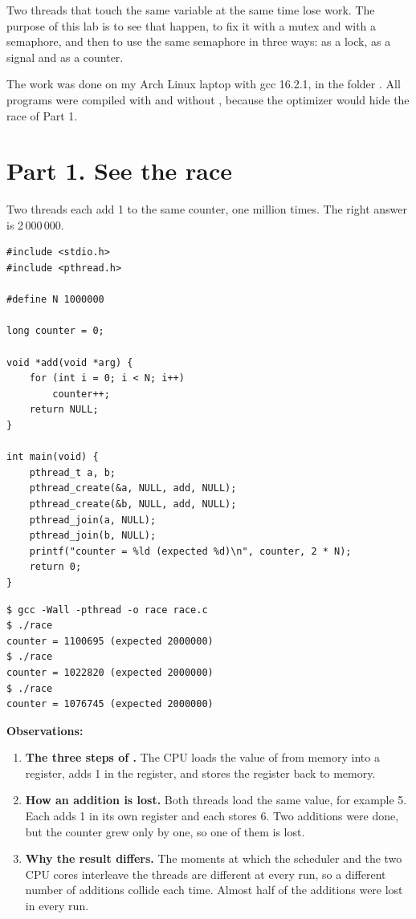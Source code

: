 \documentclass[11pt,a4paper]{article}
\begin{document}
\utmtitlepage
\tableofcontents
\newpage


Two threads that touch the same variable at the same time lose work. The purpose of this lab is
to see that happen, to fix it with a mutex and with a semaphore, and then to use the same
semaphore in three ways: as a lock, as a signal and as a counter.

The work was done on my Arch Linux laptop with gcc 16.2.1, in the folder
. All programs were compiled with  and without
, because the optimizer would hide the race of Part 1.

\section{Part 1. See the race}

Two threads each add 1 to the same counter, one million times. The right answer is 2\,000\,000.

\begin{lstlisting}[style=ccode,caption={race.c}]
#include <stdio.h>
#include <pthread.h>

#define N 1000000

long counter = 0;

void *add(void *arg) {
    for (int i = 0; i < N; i++)
        counter++;
    return NULL;
}

int main(void) {
    pthread_t a, b;
    pthread_create(&a, NULL, add, NULL);
    pthread_create(&b, NULL, add, NULL);
    pthread_join(a, NULL);
    pthread_join(b, NULL);
    printf("counter = %ld (expected %d)\n", counter, 2 * N);
    return 0;
}
\end{lstlisting}

\begin{lstlisting}[caption={Three runs of race}]
$ gcc -Wall -pthread -o race race.c
$ ./race
counter = 1100695 (expected 2000000)
$ ./race
counter = 1022820 (expected 2000000)
$ ./race
counter = 1076745 (expected 2000000)
\end{lstlisting}

\textbf{Observations:}
\begin{enumerate}
  \item \textbf{The three steps of .} The CPU loads the value of 
  from memory into a register, adds 1 in the register, and stores the register back to memory.
  \item \textbf{How an addition is lost.} Both threads load the same value, for example 5. Each
  adds 1 in its own register and each stores 6. Two additions were done, but the counter grew
  only by one, so one of them is lost.
  \item \textbf{Why the result differs.} The moments at which the scheduler and the two CPU
  cores interleave the threads are different at every run, so a different number of additions
  collide each time. Almost half of the additions were lost in every run.
\end{enumerate}
\end{document}
